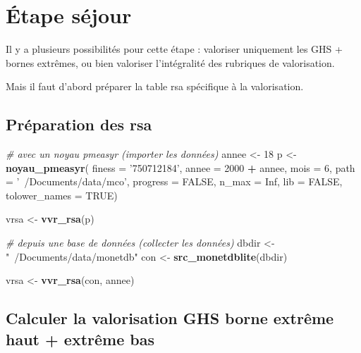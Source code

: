 \documentclass[]{book}
\newenvironment{Shaded}{\begin{snugshade}}{\end{snugshade}}
\newcommand{\CommentTok}[1]{\textcolor[rgb]{0.56,0.35,0.01}{\textit{#1}}}
\newcommand{\DataTypeTok}[1]{\textcolor[rgb]{0.13,0.29,0.53}{#1}}
\newcommand{\DecValTok}[1]{\textcolor[rgb]{0.00,0.00,0.81}{#1}}
\newcommand{\KeywordTok}[1]{\textcolor[rgb]{0.13,0.29,0.53}{\textbf{#1}}}
\newcommand{\NormalTok}[1]{#1}
\newcommand{\OperatorTok}[1]{\textcolor[rgb]{0.81,0.36,0.00}{\textbf{#1}}}
\newcommand{\OtherTok}[1]{\textcolor[rgb]{0.56,0.35,0.01}{#1}}
\newcommand{\StringTok}[1]{\textcolor[rgb]{0.31,0.60,0.02}{#1}}
\begin{document}
\hypertarget{etape-sejour}{%
\section{Étape séjour}\label{etape-sejour}}

Il y a plusieurs possibilités pour cette étape : valoriser uniquement les GHS + bornes extrêmes, ou bien valoriser l'intégralité des rubriques de valorisation.

Mais il faut d'abord préparer la table rsa spécifique à la valorisation.

\hypertarget{preparation-des-rsa}{%
\subsection{Préparation des rsa}\label{preparation-des-rsa}}

\begin{Shaded}
\begin{Highlighting}[]
\CommentTok{# avec un noyau pmeasyr (importer les données)}
\NormalTok{annee <-}\StringTok{ }\DecValTok{18}
\NormalTok{p <-}\StringTok{ }\KeywordTok{noyau_pmeasyr}\NormalTok{(}
  \DataTypeTok{finess   =} \StringTok{'750712184'}\NormalTok{,}
  \DataTypeTok{annee    =} \DecValTok{2000} \OperatorTok{+}\StringTok{ }\NormalTok{annee,}
  \DataTypeTok{mois     =} \DecValTok{6}\NormalTok{,}
  \DataTypeTok{path     =} \StringTok{'~/Documents/data/mco'}\NormalTok{,}
  \DataTypeTok{progress =} \OtherTok{FALSE}\NormalTok{,}
  \DataTypeTok{n_max    =} \OtherTok{Inf}\NormalTok{,}
  \DataTypeTok{lib      =} \OtherTok{FALSE}\NormalTok{,}
  \DataTypeTok{tolower_names =} \OtherTok{TRUE}\NormalTok{)}

\NormalTok{vrsa <-}\StringTok{ }\KeywordTok{vvr_rsa}\NormalTok{(p)}

\CommentTok{# depuis une base de données (collecter les données)}
\NormalTok{dbdir <-}\StringTok{ "~/Documents/data/monetdb"}
\NormalTok{con <-}\StringTok{ }\KeywordTok{src_monetdblite}\NormalTok{(dbdir)}

\NormalTok{vrsa <-}\StringTok{ }\KeywordTok{vvr_rsa}\NormalTok{(con, annee)}
\end{Highlighting}
\end{Shaded}

\hypertarget{calculer-la-valorisation-ghs-borne-extreme-haut-extreme-bas}{%
\subsection{Calculer la valorisation GHS borne extrême haut + extrême bas}\label{calculer-la-valorisation-ghs-borne-extreme-haut-extreme-bas}}
\end{document}
